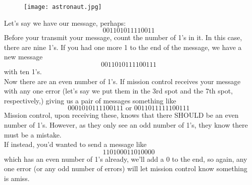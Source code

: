\begin{figure}[H]
   \centering
   \texttt{[image: astronaut.jpg]} 
\end{figure}

 \vspace{0.2cm}


Let's say we have our message, perhaps: 
\[
001101011110011
\]
Before your transmit your message, count the number of 1's in it. In this case, there are nine 1's. If you had one more 1 to the end of the message, we have a new message
\[
0011010111100111
\]
with ten 1's. \\

Now there are an even number of 1's. If mission control receives your message with any one error (let's say we put them in the 3rd spot and the 7th spot, respectively,) giving us a pair of messages something like
\[
0001010111100111 \text{ or } 0011011111100111
\]
Mission control, upon receiving these, knows that there SHOULD be an even number of 1's. However, as they only see an odd number of 1's, they know there must be a mistake. \\

If instead, you'd wanted to send a message like
\[
110100011010000
\]
which has an even number of 1's already, we'll add a 0 to the end, so again, any one error (or any odd number of errors) will let mission control know something is amiss. \\

